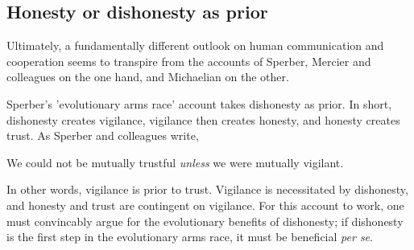 
\subsection{Honesty or dishonesty as prior}
\label{sec:honesty-dishonesty}

Ultimately, a fundamentally different outlook on human communication and cooperation seems to transpire from the accounts of Sperber, Mercier and colleagues on the one hand, and Michaelian on the other.

Sperber's 'evolutionary arms race' account takes dishonesty as prior.
In short, dishonesty creates vigilance, vigilance then creates honesty, and honesty creates trust. As Sperber and colleagues write,
\begin{quoting}
    We could not be mutually trustful \emph{unless} we were mutually vigilant.
    \hfill \citep[p.~364]{Sperber10}
\end{quoting}
In other words, vigilance is prior to trust. Vigilance is necessitated by dishonesty, and honesty and trust are contingent on vigilance.
For this account to work, one must convincably argue for the evolutionary benefits of dishonesty; if dishonesty is the first step in the evolutionary arms race, it must be beneficial \emph{per se}.

